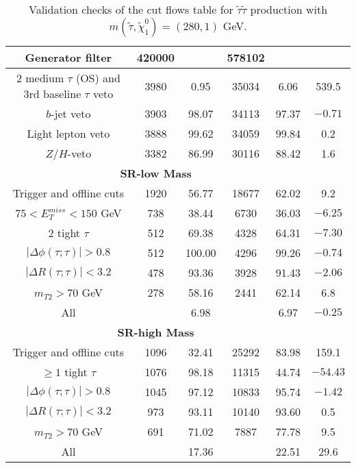 \documentclass[12pt,A4paper,pdftex, ]{article}
\begin{document}
\begin{table}[h!]
\begin{center}
\begin{tabular}{|c|c|c|c|c|c|}
Generator filter & 420000 &  & 578102 &  & \\ \hline
2 medium $\tau$ (OS) and 3rd baseline $\tau$ veto & 3980 & 0.95 & 35034 & 6.06 & 539.5 \\ \hline
$b$-jet veto & 3903 & 98.07 & 34113 & 97.37 & $-0.71$ \\ \hline
Light lepton veto & 3888 & 99.62 & 34059 & 99.84 & 0.2 \\ \hline
$Z/H$-veto & 3382 & 86.99 & 30116 & 88.42 & 1.6 \\ \hline
%
\multicolumn{5}{|c|}{ \textbf{SR-low Mass} }\\\hline
%
Trigger and offline cuts & 1920 & 56.77 & 18677 & 62.02 & 9.2 \\ \hline
$ 75 < E^{miss}_T < 150 $ GeV & 738 & 38.44 & 6730 & 36.03 & $-6.25$ \\ \hline
2 tight $\tau$ & 512 & 69.38 & 4328 & 64.31 & $-7.30$ \\ \hline
$ |\Delta\phi(\tau;\tau)| > 0.8 $ & 512 & 100.00 & 4296 & 99.26 & $-0.74$ \\ \hline
$ |\Delta R(\tau;\tau)| < 3.2 $ & 478 & 93.36 & 3928 & 91.43 & $-2.06$ \\ \hline
$ m_{T2} > 70 $ GeV & 278 & 58.16 & 2441 & 62.14 & 6.8 \\ \hline
All &  & 6.98 &  & 6.97 & $-0.25$ \\ \hline
%
\hline
\multicolumn{5}{|c|}{ \textbf{SR-high Mass} }\\\hline
%
Trigger and offline cuts & 1096 & 32.41 & 25292 & 83.98 & 159.1 \\ \hline
$ \geq 1 $ tight $\tau$ & 1076 & 98.18 & 11315 & 44.74 & $-54.43$ \\ \hline
$ |\Delta\phi(\tau;\tau)| > 0.8 $ & 1045 & 97.12 & 10833 & 95.74 & $-1.42$ \\ \hline
$ |\Delta R(\tau;\tau)| < 3.2 $ & 973 & 93.11 & 10140 & 93.60 & 0.5 \\ \hline
$ m_{T2} > 70 $ GeV & 691 & 71.02 & 7887 & 77.78 & 9.5 \\ \hline
All &  & 17.36 &  & 22.51 & 29.6 \\ \hline

\end{tabular}
\end{center}
\caption{Validation checks of the cut flows table for $ \tilde{\tau}\tilde{\tau} $ production with $ m(\tilde{\tau},\tilde{\chi}^0_1) = (280,1) $ GeV.}
\label{280GeV}
\end{table} 
\end{document}
